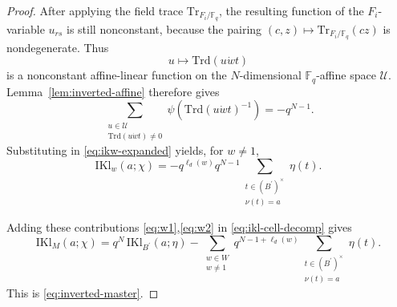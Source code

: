 \documentclass[10pt,a4paper]{amsart}
\newcommand{\IKl}{\mathrm{IKl}}
\newcommand{\Trace}{\mathrm{Tr}}
\newcommand{\Trd}{\mathrm{Trd}}
\begin{document}
\begin{proof}
After applying the field trace
\(\Trace_{F_i/\mathbb{F}_q}\), the resulting function of the
\(F_i\)-variable \(u_{rs}\) is still nonconstant, because the pairing
\((c,z)\mapsto \Trace_{F_i/\mathbb{F}_q}(cz)\) is nondegenerate.  Thus
\[
u\longmapsto \Trd(u\dot w t)
\]
is a nonconstant affine-linear function on the \(N\)-dimensional
\(\mathbb{F}_q\)-affine space \(\mathcal{U}\).  Lemma~\ref{lem:inverted-affine}
therefore gives
\[
\sum_{\substack{u\in \mathcal{U}\\ \Trd(u\dot w t)\neq 0}}
\psi(\Trd(u\dot w t)^{-1})
=
-q^{N-1}.
\]
Substituting in \eqref{eq:ikw-expanded} yields, for \(w\neq 1\),
\begin{equation}
\label{eq:w2}
\IKl_w(a;\chi)
=
-q^{\ell_d(w)}q^{N-1}
\sum_{\substack{t\in (B^{\prime})^\times\\ \nu(t)=a}}\eta(t).
\end{equation}

Adding these contributions \eqref{eq:w1},\eqref{eq:w2} in
\eqref{eq:ikl-cell-decomp} gives
\[
\IKl_M(a;\chi)
= q^N \, \IKl_{B^{\prime}}(a;\eta)
- \sum_{\substack{w\in W\\w\neq 1}} q^{N-1+\ell_d(w)}
\sum_{\substack{t\in (B^{\prime})^\times \\ \nu(t)=a}}\eta(t).
\]
This is \eqref{eq:inverted-master}.
\end{proof}
\end{document}
